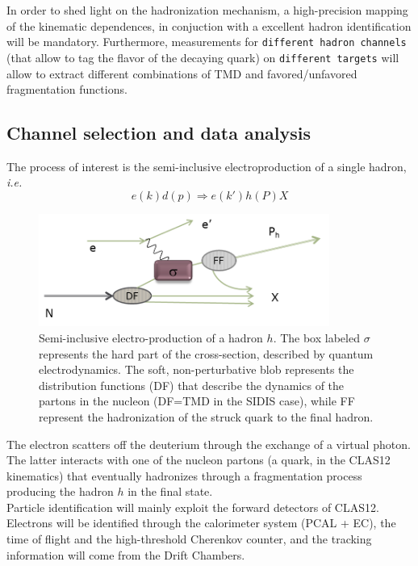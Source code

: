 In order to shed light on the hadronization mechanism, a high-precision mapping of the kinematic dependences, in conjuction with a excellent hadron identification will be mandatory. Furthermore, measurements for \texttt{different hadron channels} (that allow to tag the flavor of the decaying quark) on \texttt{different targets} will allow to extract different combinations of TMD and favored/unfavored fragmentation functions.
%
%
%
\subsection{Channel selection and data analysis}
\label{sec::channel_sel}
%
%
The process of interest is the semi-inclusive electroproduction of a single hadron, \textit{i.e.}
%
\begin{equation}
e (k) d (p) \Rightarrow e (k') h (P) X
\end{equation}
%
%
\begin{figure}
\centering
\includegraphics[width=0.85\textwidth]{sidis/sidis_drawings.png}
\caption{\label{fig::sidis} Semi-inclusive electro-production of a hadron $h$. The box labeled $\sigma$ represents the hard part of the cross-section, described by quantum electrodynamics. The soft, non-perturbative blob represents the distribution functions (DF) that describe the dynamics of the partons in the nucleon (DF=TMD in the SIDIS case), while FF represent the hadronization of the struck quark to the final hadron.}
\end{figure}
%
The electron scatters off the deuterium through the exchange of a virtual photon. The latter interacts with one of the nucleon partons (a quark, in the CLAS12 kinematics) that eventually hadronizes through a fragmentation process producing the hadron $h$ in the final state.\\
Particle identification will mainly exploit the forward detectors of CLAS12. Electrons will be identified through the calorimeter system (PCAL + EC), the time of flight and the high-threshold Cherenkov counter, and the tracking information will come from the Drift Chambers.
